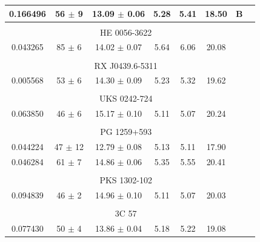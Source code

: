 \begin{longtable}{cccccccc}
            0.166496  &  56 $\pm$ 9  &  13.09 $\pm$ 0.06  &  5.28  &  5.41  &  18.50  &  B \\

            \hline \tabularnewline

            \multicolumn{7}{c}{HE 0056-3622} \\ \hline 

            0.043265  &  85 $\pm$ 6  &  14.02 $\pm$ 0.07  &  5.64  &  6.06  &  20.08  &   \\

            \hline \tabularnewline

            \multicolumn{7}{c}{RX J0439.6-5311} \\ \hline 

            0.005568  &  53 $\pm$ 6  &  14.30 $\pm$ 0.09  &  5.23  &  5.32  &  19.62  &   \\

            \hline \tabularnewline

            \multicolumn{7}{c}{UKS 0242-724} \\ \hline 

            0.063850  &  46 $\pm$ 6  &  15.17 $\pm$ 0.10  &  5.11  &  5.07  &  20.24  &   \\

            \hline \tabularnewline

            \multicolumn{7}{c}{PG 1259+593} \\ \hline 

            0.044224  &  47 $\pm$ 12  &  12.79 $\pm$ 0.08  &  5.13  &  5.11  &  17.90  &   \\
            0.046284  &  61 $\pm$ 7  &  14.86 $\pm$ 0.06  &  5.35  &  5.55  &  20.41  &   \\

            \hline \tabularnewline

            \multicolumn{7}{c}{PKS 1302-102} \\ \hline 

            0.094839  &  46 $\pm$ 2  &  14.96 $\pm$ 0.10  &  5.11  &  5.07  &  20.03  &   \\

            \hline \tabularnewline

            \multicolumn{7}{c}{3C 57} \\ \hline 

            0.077430  &  50 $\pm$ 4  &  13.86 $\pm$ 0.04  &  5.18  &  5.22  &  19.08  &   \\


\end{longtable}
